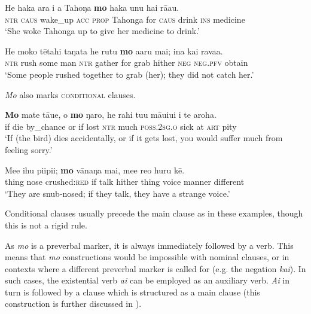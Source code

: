 \ea\label{ex:11.142}
\gll He haka {\ꞌ}ara i a Tahoŋa \textbf{mo} haka unu hai rā{\ꞌ}au. \\
\textsc{ntr} \textsc{caus} wake\_up \textsc{acc} \textsc{prop} Tahonga for \textsc{caus} drink \textsc{ins} medicine \\

\glt 
‘She woke Tahonga up to give her medicine to drink.’ \textstyleExampleref{[R301.159]} 
\z

\ea\label{ex:11.143}
\gll He moko tētahi taŋata he rutu \textbf{mo} {\ꞌ}a{\ꞌ}aru mai; {\ꞌ}ina kai rava{\ꞌ}a.\\
\textsc{ntr} rush some man \textsc{ntr} gather for grab hither \textsc{neg} \textsc{neg.pfv} obtain\\

\glt
‘Some people rushed together to grab (her); they did not catch her.’ \textstyleExampleref{[Ley-9-55.149]}
\z

\textit{Mo} also marks \textsc{conditional} clauses.

\ea\label{ex:11.144}
\gll \textbf{Mo} mate tā{\ꞌ}ue, {\ꞌ}o \textbf{mo} ŋaro, he rahi tu{\ꞌ}u māuiui {\ꞌ}i te {\ꞌ}aroha. \\
if die by\_chance or if lost \textsc{ntr} much \textsc{poss.2sg.o} sick at \textsc{art} pity \\

\glt 
‘If (the bird) dies accidentally, or if it gets lost, you would suffer much from feeling sorry.’ \textstyleExampleref{[R213.027]} 
\z

\ea\label{ex:11.145}
\gll Me{\ꞌ}e ihu pi{\ꞌ}ipi{\ꞌ}i; \textbf{mo} vānaŋa mai, me{\ꞌ}e re{\ꞌ}o huru kē. \\
thing nose crushed:\textsc{red} if talk hither thing voice manner different \\

\glt
‘They are snub-nosed; if they talk, they have a strange voice.’ \textstyleExampleref{[R310.252]} 
\z

Conditional clauses usually precede the main clause as in these examples, though this is not a rigid rule. 

As \textit{mo} is a preverbal marker, it is always immediately followed by a verb. This means that \textit{mo} constructions would be impossible with nominal clauses, or in contexts where a different preverbal marker is called for (e.g. the negation \textit{kai}). In such cases, the existential verb \textit{ai} can be employed as an auxiliary verb. \textit{Ai} in turn is followed by a clause which is structured as a main clause (this construction is further discussed in ).

